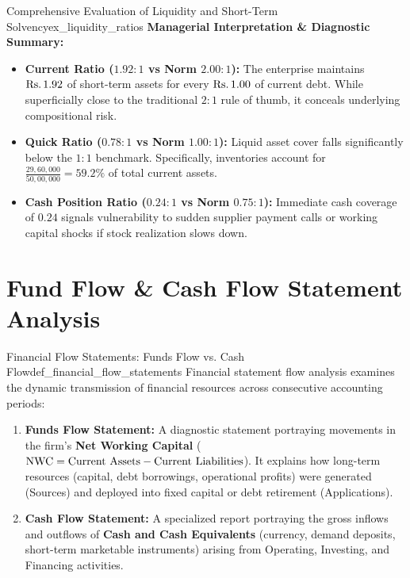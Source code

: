\begin{example}{Comprehensive Evaluation of Liquidity and Short-Term Solvency}{ex_liquidity_ratios}
\tcbline
\textbf{Managerial Interpretation \& Diagnostic Summary:}
\begin{itemize}[leftmargin=*, topsep=2pt, itemsep=2pt]
    \item \textbf{Current Ratio ($1.92:1$ vs Norm $2.00:1$):} The enterprise maintains $\text{Rs.}\, 1.92$ of short-term assets for every $\text{Rs.}\, 1.00$ of current debt. While superficially close to the traditional $2:1$ rule of thumb, it conceals underlying compositional risk.
    \item \textbf{Quick Ratio ($0.78:1$ vs Norm $1.00:1$):} Liquid asset cover falls significantly below the $1:1$ benchmark. Specifically, inventories account for $\frac{29{,}60{,}000}{50{,}00{,}000} = 59.2\%$ of total current assets.
    \item \textbf{Cash Position Ratio ($0.24:1$ vs Norm $0.75:1$):} Immediate cash coverage of $0.24$ signals vulnerability to sudden supplier payment calls or working capital shocks if stock realization slows down.
\end{itemize}
\end{example}

\section{Fund Flow \& Cash Flow Statement Analysis}

\begin{definition}{Financial Flow Statements: Funds Flow vs. Cash Flow}{def_financial_flow_statements}
Financial statement flow analysis examines the dynamic transmission of financial resources across consecutive accounting periods:
\begin{enumerate}[leftmargin=*, topsep=2pt, itemsep=2pt]
    \item \textbf{Funds Flow Statement:} A diagnostic statement portraying movements in the firm's \textbf{Net Working Capital} ($\operatorname{NWC} = \text{Current Assets} - \text{Current Liabilities}$). It explains how long-term resources (capital, debt borrowings, operational profits) were generated (Sources) and deployed into fixed capital or debt retirement (Applications).
    \item \textbf{Cash Flow Statement:} A specialized report portraying the gross inflows and outflows of \textbf{Cash and Cash Equivalents} (currency, demand deposits, short-term marketable instruments) arising from Operating, Investing, and Financing activities.
\end{enumerate}
\end{definition}

